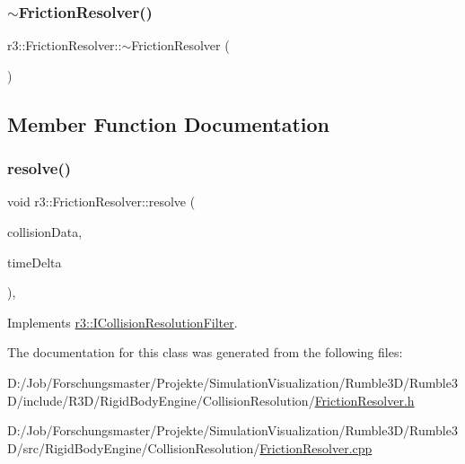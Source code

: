 \subsubsection{\texorpdfstring{$\sim$\+Friction\+Resolver()}{~FrictionResolver()}}
{\footnotesize\ttfamily r3\+::\+Friction\+Resolver\+::$\sim$\+Friction\+Resolver (\begin{DoxyParamCaption}{ }\end{DoxyParamCaption})\hspace{0.3cm}{\ttfamily [default]}}



\subsection{Member Function Documentation}
\mbox{\label{classr3_1_1_friction_resolver_af26a84959e95749088f713176ec3c096}} 
\subsubsection{\texorpdfstring{resolve()}{resolve()}}
{\footnotesize\ttfamily void r3\+::\+Friction\+Resolver\+::resolve (\begin{DoxyParamCaption}\item[{\mbox{\hyperlink{classr3_1_1_collision_data}{Collision\+Data}} \&}]{collision\+Data,  }\item[{\mbox{\hyperlink{namespacer3_ab2016b3e3f743fb735afce242f0dc1eb}{real}}}]{time\+Delta }\end{DoxyParamCaption})\hspace{0.3cm}{\ttfamily [override]}, {\ttfamily [virtual]}}



Implements \mbox{\hyperlink{classr3_1_1_i_collision_resolution_filter_a87ef2579e2acaaadef4cd8f9a20005ce}{r3\+::\+I\+Collision\+Resolution\+Filter}}.



The documentation for this class was generated from the following files\+:\begin{DoxyCompactItemize}
\item 
D\+:/\+Job/\+Forschungsmaster/\+Projekte/\+Simulation\+Visualization/\+Rumble3\+D/\+Rumble3\+D/include/\+R3\+D/\+Rigid\+Body\+Engine/\+Collision\+Resolution/\mbox{\hyperlink{_friction_resolver_8h}{Friction\+Resolver.\+h}}\item 
D\+:/\+Job/\+Forschungsmaster/\+Projekte/\+Simulation\+Visualization/\+Rumble3\+D/\+Rumble3\+D/src/\+Rigid\+Body\+Engine/\+Collision\+Resolution/\mbox{\hyperlink{_friction_resolver_8cpp}{Friction\+Resolver.\+cpp}}\end{DoxyCompactItemize}

